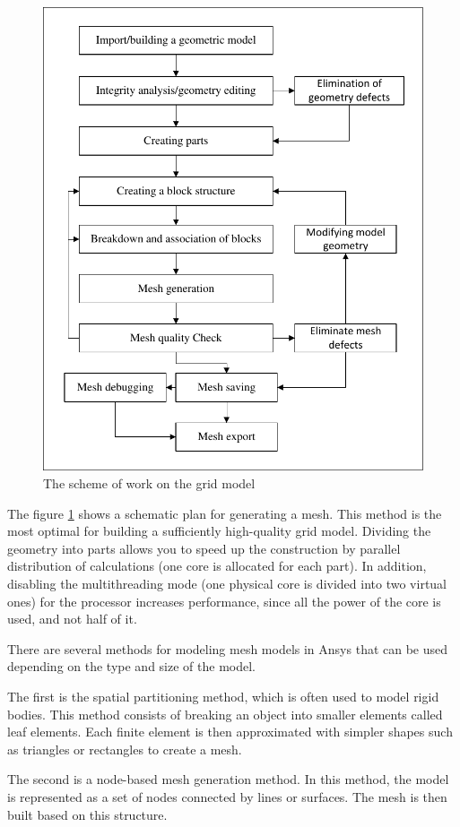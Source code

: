 	\begin{figure}[H]
		\centering
		\includegraphics[width=0.7\linewidth]{../Assets/СхемаСозданияСеткиEN}
		\caption{\footnotesize{The scheme of work on the grid model}}
		\label{fig:meshScheme}
	\end{figure}
	The figure \ref{fig:meshScheme} shows a schematic plan for generating a mesh. This method is the most optimal for building a sufficiently high-quality grid model. Dividing the geometry into parts allows you to speed up the construction by parallel distribution of calculations (one core is allocated for each part). In addition, disabling the multithreading mode (one physical core is divided into two virtual ones) for the processor increases performance, since all the power of the core is used, and not half of it.
	
	There are several methods for modeling mesh models in Ansys that can be used depending on the type and size of the model.
	
	The first is the spatial partitioning method, which is often used to model rigid bodies. This method consists of breaking an object into smaller elements called leaf elements. Each finite element is then approximated with simpler shapes such as triangles or rectangles to create a mesh.
	
	The second is a node-based mesh generation method. In this method, the model is represented as a set of nodes connected by lines or surfaces. The mesh is then built based on this structure.
	
